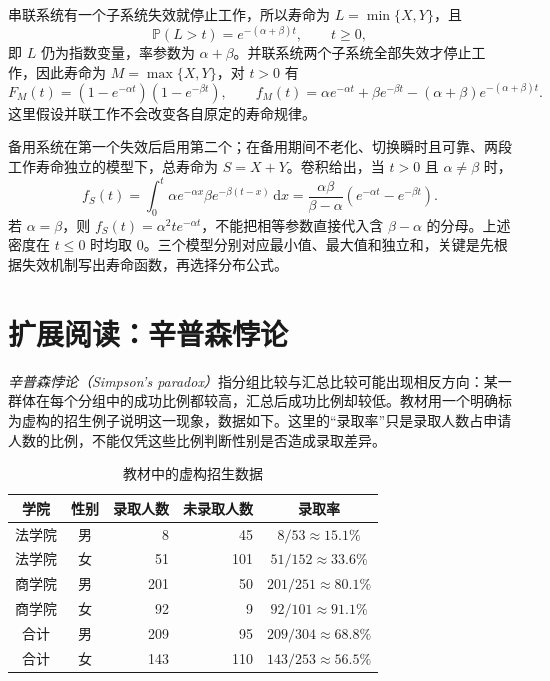 \begin{solve}
串联系统有一个子系统失效就停止工作，所以寿命为 $L=\min\{X,Y\}$，且
\[
  \mathbb P(L>t)=e^{-(\alpha+\beta)t},\qquad t\ge0,
\]
即 $L$ 仍为指数变量，率参数为 $\alpha+\beta$。并联系统两个子系统全部失效才停止工作，因此寿命为 $M=\max\{X,Y\}$，对 $t>0$ 有
\[
  F_M(t)=(1-e^{-\alpha t})(1-e^{-\beta t}),\qquad
  f_M(t)=\alpha e^{-\alpha t}+\beta e^{-\beta t}
        -(\alpha+\beta)e^{-(\alpha+\beta)t}.
\]
这里假设并联工作不会改变各自原定的寿命规律。

备用系统在第一个失效后启用第二个；在备用期间不老化、切换瞬时且可靠、两段工作寿命独立的模型下，总寿命为 $S=X+Y$。卷积给出，当 $t>0$ 且 $\alpha\ne\beta$ 时，
\[
  f_S(t)=\int_0^t\alpha e^{-\alpha x}\beta e^{-\beta(t-x)}\,\mathrm dx
        =\frac{\alpha\beta}{\beta-\alpha}
          (e^{-\alpha t}-e^{-\beta t}).
\]
若 $\alpha=\beta$，则 $f_S(t)=\alpha^2t e^{-\alpha t}$，不能把相等参数直接代入含 $\beta-\alpha$ 的分母。上述密度在 $t\le0$ 时均取 $0$。三个模型分别对应最小值、最大值和独立和，关键是先根据失效机制写出寿命函数，再选择分布公式。
\end{solve}

\section{扩展阅读：辛普森悖论}
\label{sec:study-simpson-paradox}

\emph{辛普森悖论（Simpson's paradox）}指分组比较与汇总比较可能出现相反方向：某一群体在每个分组中的成功比例都较高，汇总后成功比例却较低。教材用一个明确标为虚构的招生例子说明这一现象，数据如下。这里的“录取率”只是录取人数占申请人数的比例，不能仅凭这些比例判断性别是否造成录取差异。

\begin{table}
  \centering
  \caption{教材中的虚构招生数据}
  \label{tab:study-ch3-simpson-admissions}
  \begin{tabular}{ccrrc}
    \hline
    学院&性别&录取人数&未录取人数&录取率\\\hline
    法学院&男&8&45&$8/53\approx15.1\%$\\
    法学院&女&51&101&$51/152\approx33.6\%$\\
    商学院&男&201&50&$201/251\approx80.1\%$\\
    商学院&女&92&9&$92/101\approx91.1\%$\\\hline
    合计&男&209&95&$209/304\approx68.8\%$\\
    合计&女&143&110&$143/253\approx56.5\%$\\\hline
  \end{tabular}
\end{table}

